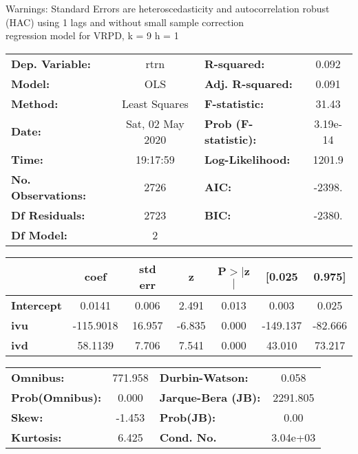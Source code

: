 Warnings: \newline
 [1] Standard Errors are heteroscedasticity and autocorrelation robust (HAC) using 1 lags and without small sample correction\\ 

regression model for VRPD, k = 9 h = 1\begin{center}
\begin{tabular}{lclc}
\toprule
\textbf{Dep. Variable:}    &       rtrn       & \textbf{  R-squared:         } &     0.092   \\
\textbf{Model:}            &       OLS        & \textbf{  Adj. R-squared:    } &     0.091   \\
\textbf{Method:}           &  Least Squares   & \textbf{  F-statistic:       } &     31.43   \\
\textbf{Date:}             & Sat, 02 May 2020 & \textbf{  Prob (F-statistic):} &  3.19e-14   \\
\textbf{Time:}             &     19:17:59     & \textbf{  Log-Likelihood:    } &    1201.9   \\
\textbf{No. Observations:} &        2726      & \textbf{  AIC:               } &    -2398.   \\
\textbf{Df Residuals:}     &        2723      & \textbf{  BIC:               } &    -2380.   \\
\textbf{Df Model:}         &           2      & \textbf{                     } &             \\
\bottomrule
\end{tabular}
\begin{tabular}{lcccccc}
                   & \textbf{coef} & \textbf{std err} & \textbf{z} & \textbf{P$> |$z$|$} & \textbf{[0.025} & \textbf{0.975]}  \\
\midrule
\textbf{Intercept} &       0.0141  &        0.006     &     2.491  &         0.013        &        0.003    &        0.025     \\
\textbf{ivu}       &    -115.9018  &       16.957     &    -6.835  &         0.000        &     -149.137    &      -82.666     \\
\textbf{ivd}       &      58.1139  &        7.706     &     7.541  &         0.000        &       43.010    &       73.217     \\
\bottomrule
\end{tabular}
\begin{tabular}{lclc}
\textbf{Omnibus:}       & 771.958 & \textbf{  Durbin-Watson:     } &    0.058  \\
\textbf{Prob(Omnibus):} &   0.000 & \textbf{  Jarque-Bera (JB):  } & 2291.805  \\
\textbf{Skew:}          &  -1.453 & \textbf{  Prob(JB):          } &     0.00  \\
\textbf{Kurtosis:}      &   6.425 & \textbf{  Cond. No.          } & 3.04e+03  \\
\bottomrule
\end{tabular}
\end{center}


